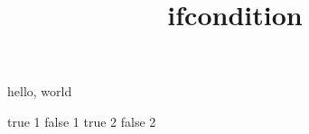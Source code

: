 \documentclass{amsart}
\title{ifcondition}
\begin{document}
\maketitle

hello, world

\protected{}

\ifcondition{}%
    \ifcondition{}%
        true 1
    \else
        false 1
    \fi
\else
    \ifcondition{}%
        true 2
    \else
        false 2
    \fi
\fi
\end{document}
